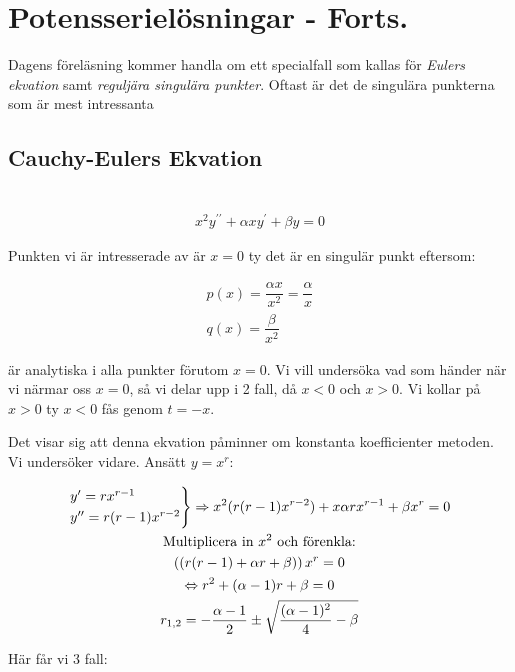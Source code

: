 \section{Potensserielösningar - Forts.}

\noindent Dagens föreläsning kommer handla om ett specialfall som kallas för \textit{Eulers ekvation} samt \textit{reguljära singulära punkter}. Oftast är det de singulära punkterna som är mest intressanta
\par\bigskip

\subsection{Cauchy-Eulers Ekvation}\hfill\\


\begin{equation*}
  \begin{gathered}
    x^2y^{\prime\prime}+\alpha xy^{\prime}+\beta y=0
  \end{gathered}
\end{equation*}
\par\bigskip
\noindent Punkten vi är intresserade av är $x=0$ ty det är en singulär punkt eftersom:


\begin{equation*}
  \begin{gathered}
    p(x) = \dfrac{\alpha x}{x^2} = \dfrac{\alpha}{x}\\
    q(x) = \dfrac{\beta}{x^2}
  \end{gathered}
\end{equation*}
\par\bigskip
\noindent är analytiska i alla punkter förutom $x=0$. Vi vill undersöka vad som händer när vi närmar oss $x=0$, så vi delar upp i 2 fall, då $x<0$ och $x>0$. Vi kollar på $x>0$ ty $x<0$ fås genom $t=-x$.
\par\bigskip
\noindent Det visar sig att denna ekvation påminner om konstanta koefficienter metoden. Vi undersöker vidare. Ansätt $y=x^r$:


\begin{equation*}
  \begin{gathered}
    \begin{rcases*}
      y^{\prime} = rx^{r-1}\\
      y^{\prime\prime}=r(r-1)x^{r-2}
    \end{rcases*}\Rightarrow x^2(r(r-1)x^{r-2})+x\alpha rx^{r-1}+\beta x^r = 0\\
    \text{Multiplicera in $x^2$ och förenkla:}\\
    \left((r(r-1)+\alpha r+\beta)\right)x^r = 0\\
    \Lrarr r^2+(\alpha -1)r+\beta =0\\
    r_{1,2} = -\dfrac{\alpha-1}{2}\pm\sqrt{\dfrac{(\alpha -1)^2}{4}-\beta}\\
  \end{gathered}
\end{equation*}
\par\bigskip
\noindent Här får vi 3 fall:

